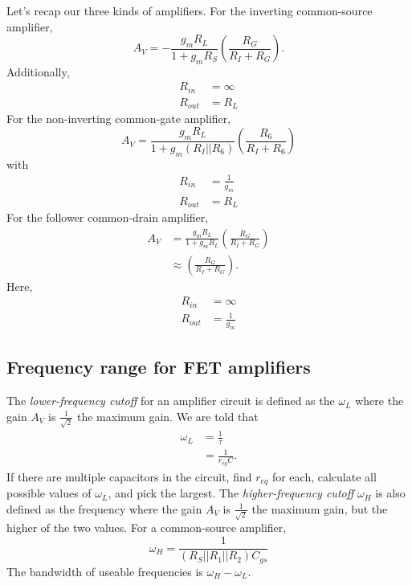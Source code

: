 \documentclass[nobib]{tufte-handout}
\begin{document}
Let's recap our three kinds of amplifiers.
For the inverting common-source amplifier, 
\begin{equation} \label{eq:29}
    A_V = -\frac{g_m R_L}{1 + g_m R_S} \left(\frac{R_G}{R_I+R_G}\right).
\end{equation}
Additionally, 
\begin{align} \label{eq:30}
    R_{in} &= \infty \\
    R_{out} &= R_L
\end{align}
For the non-inverting common-gate amplifier, 
\begin{equation} \label{eq:31}
    A_V = \frac{g_m R_L}{1 + g_m(R_I || R_6)} \left(\frac{R_6}{R_I+R_6}\right)
\end{equation}
with 
\begin{align} \label{eq:32}
    R_{in} &= \frac{1}{g_m} \\
    R_{out} &= R_L 
\end{align}
For the follower common-drain amplifier, 
\begin{align} \label{eq:33}
    A_V &= \frac{g_m R_L}{1 + g_m R_L} \left(\frac{R_G}{R_I+R_G}\right) \\
    &\approx \left(\frac{R_G}{R_I + R_G}\right). 
\end{align}
Here, 
\begin{align} \label{eq:34}
    R_{in} &= \infty \\
    R_{out} &= \frac{1}{g_m}
\end{align}

\subsection{Frequency range for FET amplifiers}

The \emph{lower-frequency cutoff} for an 
amplifier circuit is defined as the $\omega_L$ 
where the gain $A_V$ is $\frac{1}{\sqrt{2}}$
the maximum gain. 
We are told that 
\begin{align} \label{eq:omega_L}
    \omega_L &= \frac{1}{\tau} \\
    &= \frac{1}{r_{eq}C}.
\end{align}
If there are multiple capacitors in the circuit, 
find $r_{eq}$ for each, calculate all possible 
values of $\omega_L$, and pick the largest. 
The \emph{higher-frequency cutoff} $\omega_H$
is also defined as the frequency
where the gain $A_V$ is $\frac{1}{\sqrt{2}}$
the maximum gain, but the higher of the two 
values. 
For a common-source amplifier, 
\begin{equation} \label{eq:omega_H(cs)}
        \omega_H = \frac{1}{(R_S||R_1||R_2)C_{gs}}
\end{equation}
The bandwidth of useable frequencies is 
$\omega_H - \omega_L$. 
\end{document}
